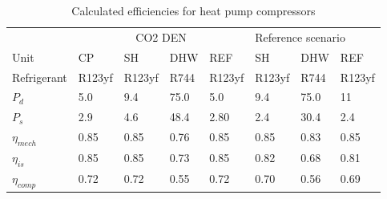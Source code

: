 \begin{table}[h!]
	\centering
	\caption{Calculated efficiencies for heat pump compressors}\vspace{2mm}
	\label{tab:eta_comp} 
\begin{tabular}{llllllll}\toprule
	\multicolumn{1}{c}{} & \multicolumn{4}{c}{CO2 DEN}     & \multicolumn{3}{l}{Reference scenario} \\
	Unit                 & CP     & SH     & DHW  & REF    & SH           & DHW       & REF         \\
	Refrigerant          & R123yf & R123yf & R744 & R123yf & R123yf       & R744      & R123yf      \\ \midrule
	$P_{d}$              & 5.0    & 9.4    & 75.0 & 5.0    & 9.4          & 75.0      & 11          \\
	$P_{s}$              & 2.9    & 4.6    & 48.4 & 2.80   & 2.4          & 30.4      & 2.4         \\
	$\eta_{mech}$        & 0.85   & 0.85   & 0.76 & 0.85   & 0.85         & 0.83      & 0.85        \\
	$\eta_{is}$          & 0.85   & 0.85   & 0.73 & 0.85   & 0.82         & 0.68      & 0.81        \\ \midrule
	$\eta_{comp}$        & 0.72   & 0.72   & 0.55 & 0.72   & 0.70         & 0.56      & 0.69       \\ \bottomrule
\end{tabular}
\end{table}